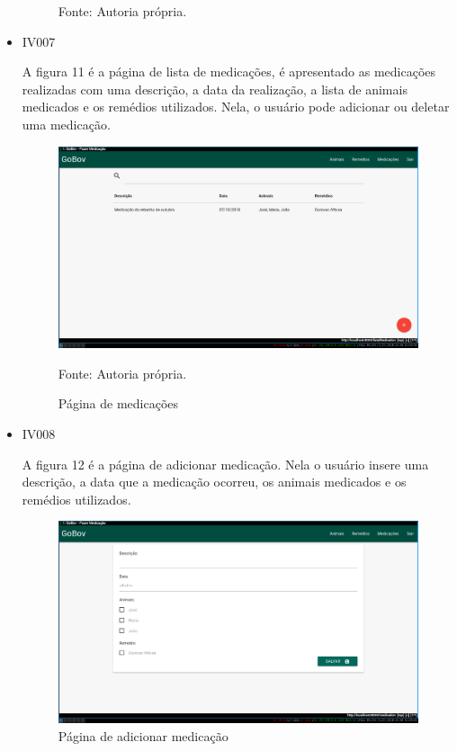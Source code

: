 \begin{itemize}
\begin{figure}[H]
\begin{center}
		Fonte: Autoria própria.
	\end{center}
\end{figure}


\item IV007

A figura 11 é a página de lista de medicações, é apresentado as medicações realizadas com uma descrição, a data da realização, a lista de animais medicados e os remédios utilizados. Nela, o usuário pode adicionar ou deletar uma medicação.
\begin{figure}[H]
	\begin{center}
		\caption{Página de medicações}
		\includegraphics[width=\textwidth]{../img/prototipos/listaMedicacao.png}

		Fonte: Autoria própria.
	\end{center}
\end{figure}

\item IV008

A figura 12 é a página de adicionar medicação. Nela o usuário insere uma descrição, a data que a medicação ocorreu, os animais medicados e os remédios utilizados.
\begin{figure}[H]
	\begin{center}
		\caption{Página de adicionar medicação}
		\includegraphics[width=\textwidth]{../img/prototipos/addMedicacao.png}


\end{center}
\end{figure}
\end{itemize}
